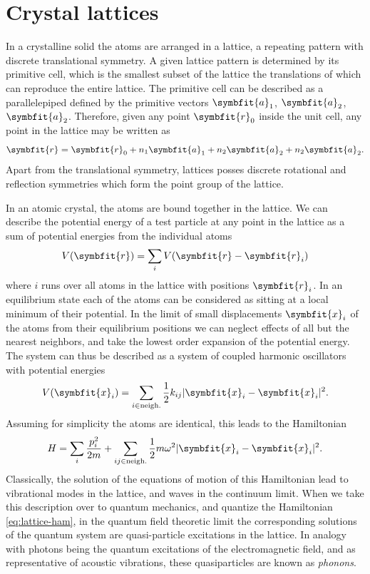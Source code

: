 \documentclass[b5paper, 10pt, twoside]{book}
\renewcommand{\vec}[1]{\symbfit{#1}}
\begin{document}
\section{Crystal lattices}

In a crystalline solid the atoms are arranged in a lattice, a repeating pattern with discrete translational symmetry. A given lattice pattern is determined by its primitive cell, which is the smallest subset of the lattice the translations of which can reproduce the entire lattice. The primitive cell can be described as a parallelepiped defined by the primitive vectors $\vec{a}_1$, $\vec{a}_2$, $\vec{a}_2$. Therefore, given any point $\vec{r}_0$ inside the unit cell, any point in the lattice may be written as
\begin{equation}
    \vec{r}=\vec{r}_0+n_1\vec{a}_1+n_2\vec{a}_2+n_2\vec{a}_2.
\end{equation}
Apart from the translational symmetry, lattices posses discrete rotational and reflection symmetries which form the point group of the lattice.

In an atomic crystal, the atoms are bound together in the lattice. We can describe the potential energy of a test particle at any point in the lattice as a sum of potential energies from the individual atoms
\begin{equation}
    V(\vec{r})=\sum_iV(\vec{r}-\vec{r}_i)
    \label{eq:crystal-atom-pe}
\end{equation}
where $i$ runs over all atoms in the lattice with positions $\vec{r}_i$. In an equilibrium state each of the atoms can be considered as sitting at a local minimum of their potential. In the limit of small displacements $\vec{x}_i$ of the atoms from their equilibrium positions we can neglect effects of all but the nearest neighbors, and take the lowest order expansion of the potential energy. The system can thus be described as a system of coupled harmonic oscillators with potential energies
\begin{equation}
    V(\vec{x}_i)=\sum_{i\in\text{neigh.}}\frac{1}{2}k_{ij}|\vec{x}_i-\vec{x}_i|^2.
\end{equation}
Assuming for simplicity the atoms are identical, this leads to the Hamiltonian
\begin{equation}
    H=\sum_i\frac{p_i^2}{2m}+\sum_{ij\in\text{neigh.}}\frac{1}{2}m\omega^2|\vec{x}_i-\vec{x}_i|^2.
    \label{eq:lattice-ham}
\end{equation}
Classically, the solution of the equations of motion of this Hamiltonian lead to vibrational modes in the lattice, and waves in the continuum limit. When we take this description over to quantum mechanics, and quantize the Hamiltonian \eqref{eq:lattice-ham}, in the quantum field theoretic limit the corresponding solutions of the quantum system are quasi-particle excitations in the lattice. In analogy with photons being the quantum excitations of the electromagnetic field, and as representative of acoustic vibrations, these quasiparticles are known as \emph{phonons}.
\end{document}
